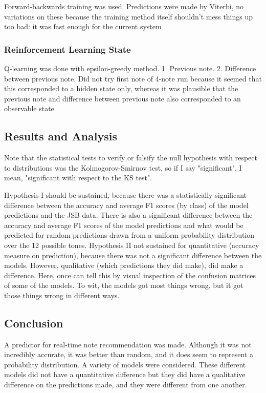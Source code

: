 \documentclass{article}
\begin{document}
Forward-backwards training was used. Predictions were made by Viterbi, no variations on these because the training method itself shouldn't mess things up too bad: it was fast enough for the current system

\subsubsection*{Reinforcement Learning State}
Q-learning was done with epsilon-greedy method.
1. Previous note.
2. Difference between previous note.
Did not try first note of 4-note run because it seemed that this corresponded to a hidden state only, whereas it was plausible that the previous note and difference between previous note also corresponded to an observable state

\subsection*{Results and Analysis}
Note that the statistical tests to verify or falsify the null hypothesis with respect to distributions was the Kolmogorov-Smirnov test, so if I say "significant", I mean, "significant with respect to the KS test".

Hypothesis I should be sustained, because there was a statistically significant difference between the accuracy and average F1 scores (by class) of the model predictions and the JSB data. There is also a significant difference between the accuracy and average F1 scores of the model predictions and what would be predicted for random predictions drawn from a uniform probability distribution over the 12 possible tones.
Hypothesis II not sustained for quantitative (accuracy measure on prediction), because there was not a significant difference between the models.
However, qualitative (which predictions they did make), did make a difference. Here, once can tell this by visual inspection of the confusion matrices of some of the models. To wit, the models got most things wrong, but it got those things wrong in different ways.

\subsection*{Conclusion}
A predictor for real-time note recommendation was made.
Although it was not incredibly accurate, it was better than random, and it does seem to represent a probability distribution.
A variety of models were considered.
These different models did not have a quantitative difference but they did have a qualitative difference on the predictions made, and they were different from one another.
\end{document}
